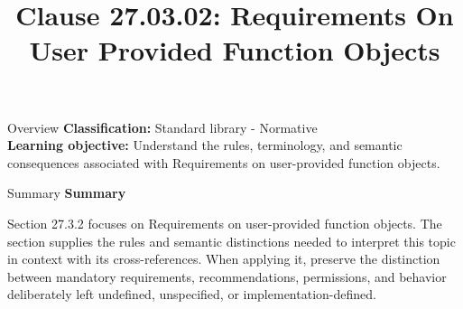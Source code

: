 \documentclass[10pt,letterpaper]{article}
\title{Clause 27.03.02: Requirements On User Provided Function Objects}
\author{}
\date{}
\begin{document}
\maketitle
\begin{CornellOverviewBox}{Overview}
\textbf{Classification:} Standard library - Normative\\[2pt]
\textbf{Learning objective:} Understand the rules, terminology, and semantic consequences associated with Requirements on user-provided function objects.
\end{CornellOverviewBox}\begin{CornellSummaryBox}{Summary}
{\sffamily\bfseries\color{Accent} Summary}\par\vspace{3pt}Section 27.3.2 focuses on Requirements on user-provided function objects. The section supplies the rules and semantic distinctions needed to interpret this topic in context with its cross-references. When applying it, preserve the distinction between mandatory requirements, recommendations, permissions, and behavior deliberately left undefined, unspecified, or implementation-defined.
\end{CornellSummaryBox}
\end{document}
